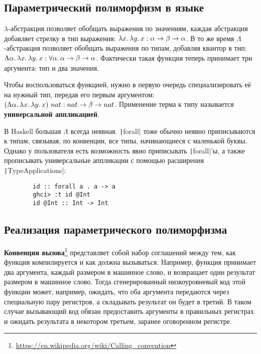 \documentclass[12pt]{article}
\newcommand{\vocab}[1]{\textbf{#1}} %
\newcommand{\ap}{~}
\begin{document}
    \subsection{Параметрический полиморфизм в языке}

    $\lambda$-абстракция позволяет обобщать выражения по значениям, каждая абстракция добавляет стрелку в тип выражения: $\lambda x\ldotp \lambda y\ldotp x : \alpha\to\beta\to\alpha$.
    В то же время $\Lambda$-абстракция позволяет обобщать выражения по типам, добавляя квантор в тип: $\Lambda \alpha\ldotp\lambda x\ldotp \lambda y\ldotp x : \forall \alpha\ldotp \alpha\to\beta\to\alpha$.
    Фактически такая функция теперь принимает три аргумента: тип и два значения.

    Чтобы воспользоваться функцией, нужно в первую очередь специализировать её на нужный тип, передав его первым аргументом: $(\Lambda \alpha\ldotp\lambda x\ldotp \lambda y\ldotp x)\ap nat : nat\to\beta\to nat$.
    Применение терма к типу называется \vocab{универсальной аппликацией}.

    В Haskell большая $\Lambda$ всегда неявная.
    \texttt|forall| тоже обычно неявно приписываются к типам, связывая, по конвенции, все типы, начинающиеся с маленькой буквы.
    Однако у пользователя есть возможность явно приписывать \texttt|forall|'ы, а также прописывать универсальные аппликации с помощью расширения \texttt|TypeApplications|:
    \begin{verbatim}
        id :: forall a . a -> a
        ghci> :t id @Int
        id @Int :: Int -> Int
    \end{verbatim}


    \subsection{Реализация параметрического полиморфизма}


    \vocab{Конвенция вызова}\footnote{\url{https://en.wikipedia.org/wiki/Calling_convention}} представляет собой набор соглашений между тем, как функция компилируется и как должна вызываться.
    Например, функция принимает два аргумента, каждый размером в машинное слово, и возвращает один результат размером в машинное слово.
    Тогда сгенерированный низкоуровневый код этой функции может, например, ожидать, что оба аргумента передаются через специальную пару регистров, а складывать результат он будет в третий.
    В таком случае вызывающий код обязан предоставить аргументы в правильных регистрах и ожидать результата в некотором третьем, заранее оговоренном регистре.
\end{document}
